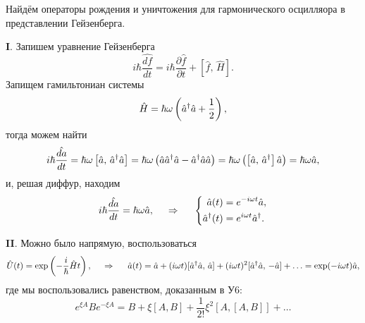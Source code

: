 
Найдём операторы рождения и уничтожения для гармонического осцилляора в представлении Гейзенберга. 

\textbf{I}. Запишем уравнение Гейзенберга
\begin{equation*}
    i \hbar \frac{\hat{d f}}{d t}  = i \hbar \frac{\partial \hat{f}}{\partial t} + \left[\hat{f},\, \hat{H}\right].
\end{equation*}
Запищем гамильтониан системы
\begin{equation*}
    \hat{H} = \hbar \omega \left(\hat{a}^{\dag} \hat{a} + \frac{1}{2}\right),
\end{equation*}
тогда можем найти
\begin{equation*}
    i \hbar \frac{\hat{d a}}{d t} = \hbar \omega \left[\hat{a},\, \hat{a}^{\dag} \hat{a}\right] = \hbar \omega \left(
        \hat{a} \hat{a}^{\dag} \hat{a} - \hat{a}^{\dag} \hat{a} \hat{a}
    \right) = \hbar \omega \left(
        \left[\hat{a},\, \hat{a}^{\dag}\right] \hat{a}
    \right) = \hbar \omega \hat{a},
\end{equation*}
и, решая диффур, находим
\begin{equation*}
    i \hbar \frac{\hat{d a}}{d t} = \hbar \omega \hat{a},
    \hspace{0.5cm} \Rightarrow \hspace{0.5cm}
    \left\{\begin{aligned}
        \hat{a}(t) &= e^{- i \omega t} \hat{a}, \\
        \hat{a}^{\dag}(t) &= e^{i \omega t} \hat{a}^{\dag}.
    \end{aligned}\right.
\end{equation*}

\textbf{II}. Можно было напрямую, воспользоваться
\begin{equation*}
    \hat{U}(t) = \exp\left(
        - \frac{i}{\hbar} \hat{H} t
    \right),
    \hspace{0.5cm} \Rightarrow \hspace{0.5cm}
    \hat{a}(t) = \hat{a} + (i \omega t) [
        \hat{a}^{\dag} \hat{a},\, \hat{a}
    ] + (i \omega t)^2 [\hat{a}^{\dag} \hat{a},\, -\hat{a}] + \ldots = \exp(- i \omega t) \hat{a}, 
\end{equation*}
где мы воспользовались равенством, доказанным в У6:
\begin{equation*}
    e^{\xi A} B e^{- \xi A} = B + \xi [A, B] + \frac{1}{2!} \xi^2 \left[A, [A, B]\right] + \ldots
\end{equation*}
